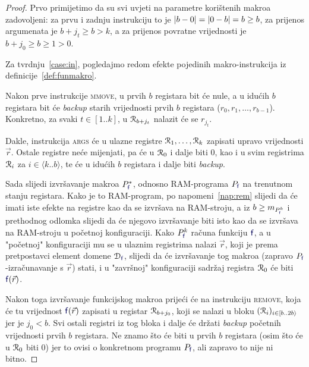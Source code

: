 \begin{proof}
Prvo primijetimo da su svi uvjeti na parametre korištenih makroa zadovoljeni: za prvu i zadnju instrukciju to je $\lvert b-0\rvert=\lvert0-b\rvert=b\ge b$, za prijenos argumenata je $b+j_t\ge b>k$, a za prijenos povratne vrijednosti je $b+j_0\ge b\ge 1>0$.

Za tvrdnju~\ref{case:in}, pogledajmo redom efekte pojedinih makro-instrukcija iz definicije~\ref{def:funmakro}.

Nakon prve instrukcije \textsc{mmove}, u prvih $b$ registara bit će nule, a u idućih $b$ registara bit će \emph{backup} starih vrijednosti prvih $b$ registara ($r_0,r_1,\dotsc,r_{b-1}$). Konkretno, za svaki $t\in[1..k]$, u $\mathcal R_{b+j_t}$ nalazit će se $r_{j_t}$.

Dakle, instrukcija \textsc{args} će u ulazne registre $\mathcal R_{1},\dotsc,\mathcal R_{k}$ zapisati upravo vrijednosti $\vec r$. Ostale registre neće mijenjati, pa će u $\mathcal R_{0}$ i dalje biti $0$, kao i u svim registrima $\mathcal R_{i}$ za $i\in\langle k..b\rangle$, te će u idućih $b$ registara i dalje biti \emph{backup}.

Sada slijedi izvršavanje makroa $P_{\f{f}}^*$, odnosno RAM-programa $P_{\f{f}}$ na trenutnom stanju registara. Kako je to RAM-program, po napomeni~\ref{nap:rem} slijedi da će imati iste efekte na registre kao da se izvršava na RAM-stroju, a iz $b\ge m_{P_{\f{f}}^k}$ i prethodnog odlomka slijedi da će njegovo izvršavanje biti isto kao da se izvršava na  RAM-stroju u početnoj konfiguraciji. Kako $P_{\f{f}}^k$ računa funkciju $\f{f}$, a u "početnoj" konfiguraciji mu se u ulaznim registrima nalazi $\vec r$, koji je prema pretpostavci element domene $\dom{\f{f}}$, slijedi da će izvršavanje tog makroa  (zapravo $P_{\f{f}}$-izračunavanje s $\vec r$) stati, i u "završnoj" konfiguraciji sadržaj registra $\mathcal R_{0}$ će biti $\f{f}(\vec r)$.

Nakon toga izvršavanje funkcijskog makroa prijeći će na instrukciju \textsc{remove}, koja će tu vrijednost $\f{f}(\vec r)$ zapisati u registar $\mathcal R_{b+j_0}$, koji se nalazi u bloku $(\mathcal R_{i})_{i\in[b..2b\rangle}$ jer je $j_0<b$. Svi ostali registri iz tog bloka i dalje će držati \emph{backup} početnih vrijednosti prvih $b$ registara. Ne znamo što će biti u prvih $b$ registara (osim što će u $\mathcal R_{0}$ biti $0$) jer to ovisi o konkretnom programu $P_{\f{f}}$, ali zapravo to nije ni bitno.


\end{proof}
